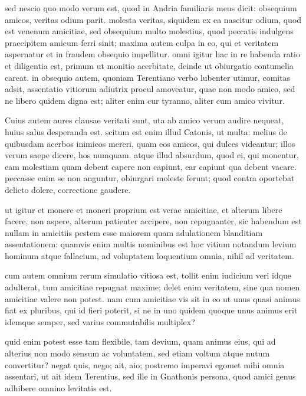  sed nescio quo modo verum est, quod in Andria familiaris meus dicit: obsequium amicos, veritas odium parit. molesta veritas, siquidem ex ea nascitur odium, quod est venenum amicitiae, sed obsequium multo molestius, quod peccatis indulgens praecipitem amicum ferri sinit; maxima autem culpa in eo, qui et veritatem aspernatur et in fraudem obsequio impellitur. omni igitur hac in re habenda ratio et diligentia est, primum ut monitio acerbitate, deinde ut obiurgatio contumelia careat. in obsequio autem, quoniam Terentiano verbo lubenter utimur, comitas adsit, assentatio vitiorum adiutrix procul amoveatur, quae non modo amico, sed ne libero quidem digna est; aliter enim cur tyranno, aliter cum amico vivitur.

 Cuius autem aures clausae veritati sunt, uta ab amico verum audire nequeat, huius salus desperanda est. scitum est enim illud Catonis, ut multa: melius de quibusdam acerbos inimicos mereri, quam eos amicos, qui dulces videantur; illos verum saepe dicere, hos numquam. atque illud absurdum, quod ei, qui monentur, eam molestiam quam debent capere non capiunt, ear capiunt qua debent vacare. peccasse enim se non anguntur, obiurgari moleste ferunt; quod contra oportebat delicto dolere, correctione gaudere.

 ut igitur et monere et moneri proprium est verae amicitiae, et alterum libere facere, non aspere, alterum patienter accipere, non repugnanter, sic habendum est nullam in amicitiis pestem esse maiorem quam adulationem blanditiam assentationem: quamvis enim multis nominibus est hoc vitium notandum levium hominum atque fallacium, ad voluptatem loquentium omnia, nihil ad veritatem.

 cum autem omnium rerum simulatio vitiosa est, tollit enim iudicium veri idque adulterat, tum amicitiae repugnat maxime; delet enim veritatem, sine qua nomen amicitiae valere non potest. nam cum amicitiae vis sit in eo ut unus quasi animus fiat ex pluribus, qui id fieri poterit, si ne in uno quidem quoque unus animus erit idemque semper, sed varius commutabilis multiplex?

 quid enim potest esse tam flexibile, tam devium, quam animus eius, qui ad alterius non modo sensum ac voluntatem, sed etiam voltum atque nutum convertitur? negat quis, nego; ait, aio; postremo imperavi egomet mihi omnia assentari, ut ait idem Terentius, sed ille in Gnathonis persona, quod amici genus adhibere omnino levitatis est.

